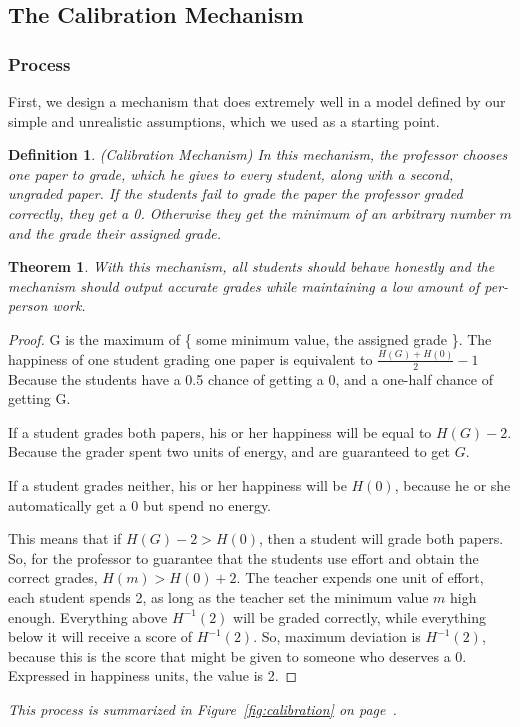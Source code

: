 \documentclass[12pt, Arial]{article}
\newtheorem{theorem}{Theorem}
\newtheorem{definition}{Definition}
\begin{document}
\subsection{The Calibration Mechanism}
\label{sec:calibration}

\subsubsection{Process}
First, we design a mechanism that does extremely well in a model defined by our simple and unrealistic assumptions, which we used as a starting point.
\begin{definition}(Calibration Mechanism)
In this mechanism, the professor chooses one paper to grade, which he gives to every student, along with a second, ungraded paper. If the students fail to grade the paper the professor graded correctly, they get a 0. Otherwise they get the minimum of an arbitrary number $m$ and the grade their assigned grade.
\end{definition}
\begin{theorem}
With this mechanism, all students should behave honestly and the mechanism should output accurate grades while maintaining a low amount of per-person work.
\end{theorem}

\begin{proof}
G is the maximum of \{ some minimum value, the assigned grade \}.
The happiness of one student grading one paper is equivalent to $\frac{H(G)+H(0)}{2}-1$ Because the students have a 0.5 chance of getting a 0, and a one-half chance of getting G.

If a student grades both papers, his or her happiness will be equal to $H(G)-2$. Because the grader spent two units of energy, and are guaranteed to get $G$.

If a student grades neither, his or her happiness will be $H(0)$, because he or she automatically get a 0 but spend no energy.

This means that if $H(G) - 2 > H(0)$, then a student will grade both papers. So, for the professor to guarantee that the students use effort and obtain the correct grades, $H(m) > H(0) + 2$.
The teacher expends one unit of effort, each student spends 2, as long as the teacher set the minimum value $m$ high enough.
Everything above $H^{-1}(2)$ will be graded correctly, while everything below it will receive a score of $H^{-1}(2)$.
So, maximum deviation is $H^{-1}(2)$, because this is the score that might be given to someone who deserves a 0. Expressed in happiness units, the value is 2.
\end{proof}
\emph{This process is summarized in Figure~\ref{fig:calibration} on page~\pageref{fig:calibration}.}
\end{document}
